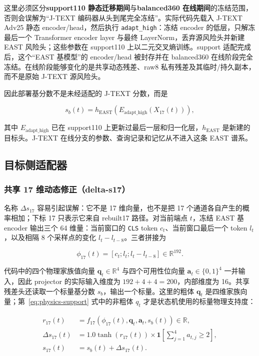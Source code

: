 \documentclass[11pt,a4paper]{article}
\newcommand{\code}[1]{\texttt{\small #1}}
\begin{document}
这里必须区分\textbf{support110 静态迁移期间}与\textbf{balanced360 在线期间}的冻结范围，否则会误解为“J-TEXT 编码器从头到尾完全冻结”。实际代码先载入 J-TEXT Adv25 静态 encoder/head，然后执行 \code{adapt\_high}：冻结 encoder 的低层，只解冻最后一个 Transformer encoder layer 与最终 LayerNorm，丢弃源风险头并新建 EAST 风险头；这些参数在 support110 上以二元交叉熵训练。support 适配完成后，这个“EAST 基模型”的 encoder/head 被封存并在 balanced360 在线阶段完全冻结。在线阶段能够变化的是共享动态残差、raw8 私有残差及其临时/持久副本，而不是原始 J-TEXT 源风险头。

因此部署基分数不是未经适配的 J-TEXT 分数，而是

\[
s_b(t)=h_{\mathrm{EAST}}
\!\left(E_{\mathrm{adapt\_high}}(X_{17}(t))\right),
\]

其中 \(E_{\mathrm{adapt\_high}}\) 已在 support110 上更新过最后一层和归一化层，\(h_{\mathrm{EAST}}\) 是新建的目标头。J-TEXT 在线分支的参数、查询记录和记忆从不进入这条 EAST 谱系。

\subsection{目标侧适配器}

\subsubsection{共享 17 维动态修正（delta-s17）}

名称 \(\Delta s_{17}\) 容易引起误解：它不是 17 维向量，也不是把 17 个通道各自产生的概率相加；下标 17 只表示它来自 rebuilt17 路径。对当前端点 \(t\)，冻结 EAST 基 encoder 输出三个 64 维量：当前窗口的 \code{CLS} token \(c_t\)、当前窗口最后一个 token \(l_t\)，以及相隔 8 个采样点的变化 \(l_t-l_{t-8}\)。三者拼接为

\[
\phi_{17}(t)=[c_t;l_t;l_t-l_{t-8}]\in\mathbb{R}^{192}.
\]

代码中的四个物理家族值向量 \(\mathbf q_t\in\mathbb{R}^{4}\) 与四个可用性位向量 \(\mathbf a_t\in\{0,1\}^{4}\) 一并输入，因此 projector 的实际输入维度为 \(192+4+4=200\)，内部维度为 16。共享残差头还读取一个标量基分数 \(s_b\)，输出一个标量。这里的粗体 \(\mathbf q_t\) 是四维家族向量；第~\ref{eq:physics-support} 式中的非粗体 \(q_t\) 才是状态机使用的标量物理支持度：

\begin{align}
r_{17}(t)&=f_{17}\!\left(\phi_{17}(t),\mathbf q_t,\mathbf a_t,s_b(t)\right)\in\mathbb{R},\\
\Delta s_{17}(t)&=
1.0\tanh(r_{17}(t))\times
\mathbf{1}\!\left[\sum_{j=1}^{4}a_{t,j}\geq2\right],\\
s_{17}(t)&=s_b(t)+\Delta s_{17}(t).
\label{eq:shared-adapter}
\end{align}
\end{document}
